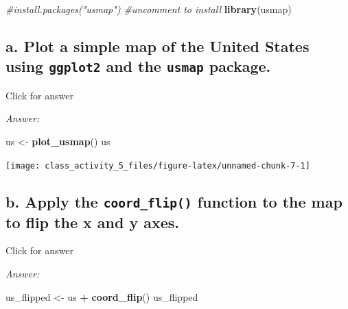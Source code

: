 \documentclass[
]{book}
\newenvironment{Shaded}{\begin{snugshade}}{\end{snugshade}}
\newcommand{\CommentTok}[1]{\textcolor[rgb]{0.56,0.35,0.01}{\textit{#1}}}
\newcommand{\FunctionTok}[1]{\textcolor[rgb]{0.13,0.29,0.53}{\textbf{#1}}}
\newcommand{\NormalTok}[1]{#1}
\newcommand{\OtherTok}[1]{\textcolor[rgb]{0.56,0.35,0.01}{#1}}
\newcommand{\SpecialCharTok}[1]{\textcolor[rgb]{0.81,0.36,0.00}{\textbf{#1}}}
\begin{document}
\begin{Shaded}
\begin{Highlighting}[]
\CommentTok{\#install.packages("usmap")   \#uncomment to install}
\FunctionTok{library}\NormalTok{(usmap)}
\end{Highlighting}
\end{Shaded}

\hypertarget{a.-plot-a-simple-map-of-the-united-states-using-ggplot2-and-the-usmap-package.}{%
\subsection{\texorpdfstring{a. Plot a simple map of the United States using \texttt{ggplot2} and the \texttt{usmap} package.}{a. Plot a simple map of the United States using ggplot2 and the usmap package.}}\label{a.-plot-a-simple-map-of-the-united-states-using-ggplot2-and-the-usmap-package.}}

Click for answer

\emph{Answer:}

\begin{Shaded}
\begin{Highlighting}[]
\NormalTok{us }\OtherTok{\textless{}{-}} \FunctionTok{plot\_usmap}\NormalTok{()}
\NormalTok{us}
\end{Highlighting}
\end{Shaded}

\texttt{[image: class\_activity\_5\_files/figure-latex/unnamed-chunk-7-1]}

\hypertarget{b.-apply-the-coord_flip-function-to-the-map-to-flip-the-x-and-y-axes.}{%
\subsection{\texorpdfstring{b. Apply the \texttt{coord\_flip()} function to the map to flip the x and y axes.}{b. Apply the coord\_flip() function to the map to flip the x and y axes.}}\label{b.-apply-the-coord_flip-function-to-the-map-to-flip-the-x-and-y-axes.}}

Click for answer

\emph{Answer:}

\begin{Shaded}
\begin{Highlighting}[]
\NormalTok{us\_flipped }\OtherTok{\textless{}{-}}\NormalTok{ us }\SpecialCharTok{+} \FunctionTok{coord\_flip}\NormalTok{()}
\NormalTok{us\_flipped}
\end{Highlighting}
\end{Shaded}
\end{document}
